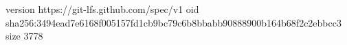 version https://git-lfs.github.com/spec/v1
oid sha256:3494ead7e6168f005157fd1cb9bc79c6b8bbabb90888900b164b68f2c2ebbcc3
size 3778
